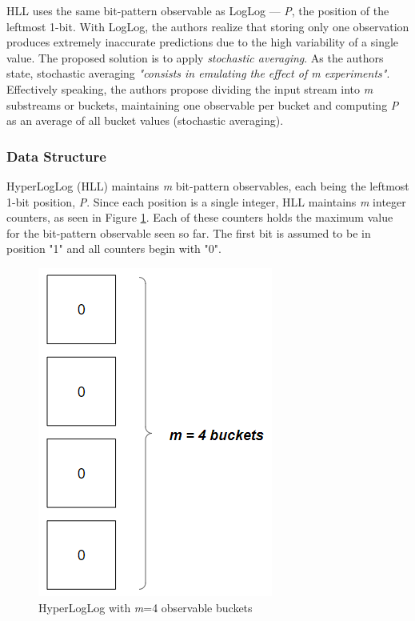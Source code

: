 HLL uses the same bit-pattern observable as LogLog --- \textit{P}, the position of the leftmost 1-bit. With LogLog, the authors realize that storing only one observation produces extremely inaccurate predictions due to the high variability of a single value. The proposed solution is to apply \textit{stochastic averaging}. As the authors state, stochastic averaging \textit{"consists in emulating the effect of m experiments"}. Effectively speaking, the authors propose dividing the input stream into \textit{m} substreams or buckets, maintaining one observable per bucket and computing \textit{P} as an average of all bucket values (stochastic averaging).

\subsubsection*{Data Structure}
HyperLogLog (HLL) maintains \textit{m} bit-pattern observables, each being the leftmost 1-bit position, \textit{P}. Since each position is a single integer, HLL maintains \textit{m} integer counters, as seen in Figure \ref{fig:hll-ds}. Each of these counters holds the maximum value for the bit-pattern observable seen so far. The first bit is assumed to be in position "1" and all counters begin with "0".

\begin{figure}[!htb]
    \begin{center}
      \includegraphics[scale=0.6]{figures/hll-ds.png}
      \caption[HyperLogLog initial state]{HyperLogLog with \textit{m}=4 observable buckets}
      \label{fig:hll-ds}
    \end{center}
\end{figure}


